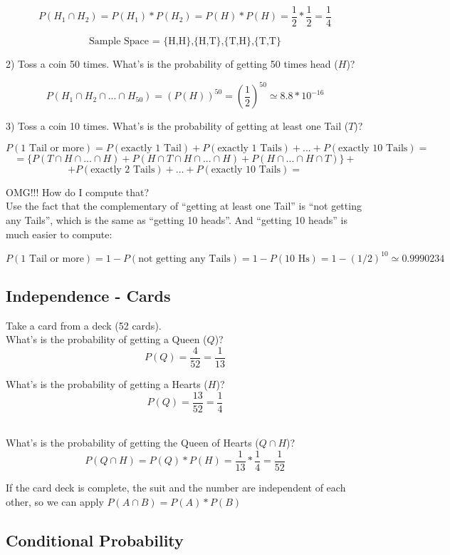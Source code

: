 \documentclass[11pt]{article}
\begin{document}
	\[P(H_1\cap H_2) = P(H_1) * P(H_2) = P(H) * P(H) =\frac{1}{2} * \frac{1}{2} = \frac{1}{4}\]

	\[\text{Sample Space = \{H,H\},\{H,T\},\{T,H\},\{T,T\}}\]
	
	2) Toss a coin 50 times. What's is the probability of getting 50 times head ($H$)?

	\[P(H_1\cap H_2 \cap...\cap H_{50}) = (P(H))^{50} = (\frac{1}{2})^{50} \simeq 8.8 * 10^{-16}\]
	
	3) Toss a coin 10 times. What's is the probability of  getting at least one Tail ($T$)?
	
	\[P(\text{1 Tail or more}) = P(\text{exactly 1 Tail}) + P(\text{exactly 1 Tails}) + ... + P(\text{exactly 10 Tails}) =\]
	\[= \{P(T\cap H \cap ... \cap H) + P(H \cap T\cap H \cap ... \cap H) + P(H \cap ... \cap H \cap T)\} +  \]
	\[+P(\text{exactly 2 Tails}) + ... + P(\text{exactly 10 Tails}) =\]

	OMG!!! How do I compute that?\\

	Use the fact that the complementary of ``getting at least one Tail'' is ``not getting any Tails'', which is the same as ``getting 10 heads''. And ``getting 10 heads'' is much easier to compute:
	
	\[P(\text{1 Tail or more}) = 1 - P(\text{not getting any Tails}) = 1 - P(\text{10 Hs}) = 1 - (1/2)^{10}  \simeq 0.9990234\]


	\subsection*{Independence - Cards}
	
	Take a card from a deck (52 cards).\\
	
	What's is the probability of getting a Queen ($Q$)?
	\[P(Q) = \frac{4}{52} = \frac{1}{13}\]
	
	What's is the probability of getting a Hearts ($H$)?
	\[P(Q) = \frac{13}{52} = \frac{1}{4}\]\
	
	
	What's is the probability of getting the Queen of Hearts ($Q \cap H$)?
	\[P(Q \cap H) = P(Q) * P(H) = \frac{1}{13} * \frac{1}{4} = \frac{1}{52}\]

	If the card deck is complete, the suit and the number are independent of each other, so we can apply $P(A \cap B) = P(A) * P(B)$

	\subsection*{Conditional Probability}
	
\end{document}
